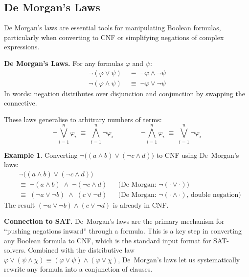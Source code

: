 \documentclass[11pt, a4paper]{article}
\theoremstyle{definition}
\newtheorem{example}{Example}[section]
\theoremstyle{remark}
\begin{document}
\subsection{De Morgan's Laws}

De Morgan's laws are essential tools for manipulating Boolean formulas, particularly when
converting to CNF or simplifying negations of complex expressions.

\begin{defbox}
\textbf{De Morgan's Laws.}  For any formulas $\varphi$ and $\psi$:
\begin{align*}
  \lnot(\varphi\lor\psi)  &\;\equiv\; \lnot\varphi\land\lnot\psi \\
  \lnot(\varphi\land\psi) &\;\equiv\; \lnot\varphi\lor\lnot\psi
\end{align*}
In words: negation distributes over disjunction and conjunction by swapping the connective.
\end{defbox}

These laws generalise to arbitrary numbers of terms:
\[
  \lnot\bigvee_{i=1}^n \varphi_i \;\equiv\; \bigwedge_{i=1}^n \lnot\varphi_i
  \qquad\qquad
  \lnot\bigwedge_{i=1}^n \varphi_i \;\equiv\; \bigvee_{i=1}^n \lnot\varphi_i
\]

\begin{example}
Converting $\lnot\bigl((a\land b)\lor(\lnot c\land d)\bigr)$ to CNF using De~Morgan's laws:
\begin{align*}
  &\lnot\bigl((a\land b)\lor(\lnot c\land d)\bigr) \\
  &\equiv\; \lnot(a\land b)\;\land\;\lnot(\lnot c\land d)
    &&\text{(De Morgan: $\lnot(\cdot\lor\cdot)$)} \\
  &\equiv\; (\lnot a\lor\lnot b)\;\land\;(c\lor\lnot d)
    &&\text{(De Morgan: $\lnot(\cdot\land\cdot)$, double negation)}
\end{align*}
The result $(\lnot a\lor\lnot b)\land(c\lor\lnot d)$ is already in CNF.
\end{example}

\begin{insightbox}
\textbf{Connection to SAT.}  De~Morgan's laws are the primary mechanism for ``pushing
negations inward'' through a formula.  This is a key step in converting any Boolean formula
to CNF, which is the standard input format for SAT-solvers.  Combined with the
distributive law $\varphi\lor(\psi\land\chi)\equiv(\varphi\lor\psi)\land(\varphi\lor\chi)$,
De~Morgan's laws let us systematically rewrite any formula into a conjunction of clauses.
\end{insightbox}
\end{document}
